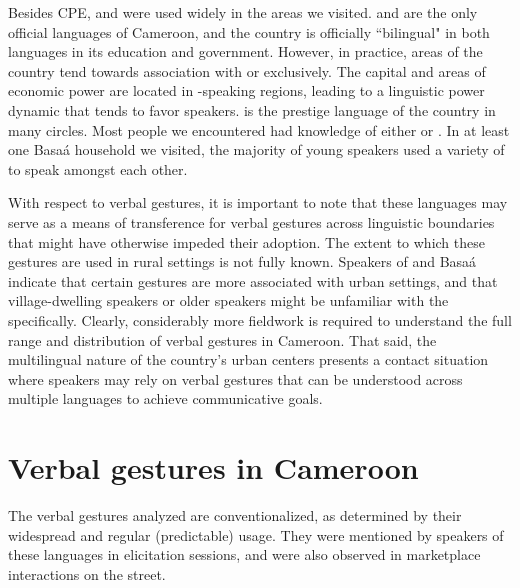 \documentclass[output=paper
,newtxmath
,modfonts
,nonflat]{langsci/langscibook}
\begin{document}
Besides CPE,  and  were used widely in the areas we visited.   and  are the only official languages of Cameroon, and the country is officially ``bilingual" in both languages in its education and government. However, in practice, areas of the country tend towards association with  or  exclusively. The capital and areas of economic power are located in -speaking regions, leading to a linguistic power dynamic that tends to favor  speakers.  is the prestige language of the country in many circles. Most people we encountered had knowledge of either  or . In at least one Basa\'a household we visited, the majority of young speakers used a variety of  to speak amongst each other. 

With respect to verbal gestures, it is important to note that these languages may serve as a means of transference for verbal gestures across linguistic boundaries that might have otherwise impeded their adoption. The extent to which these gestures are used in rural settings is not fully known. Speakers of  and Basa\'a indicate that certain gestures are more associated with urban settings, and that village-dwelling speakers or older speakers might be unfamiliar with the  specifically.  Clearly, considerably more fieldwork is required to understand the full range and distribution of verbal gestures in Cameroon. That said, the multilingual nature of the country's urban centers presents a  contact situation where speakers may rely on verbal gestures that can be understood across multiple languages to achieve communicative goals.


\section{Verbal gestures in Cameroon}\label{sec:pillion:vg}
The verbal gestures analyzed are conventionalized, as determined by their widespread and regular (predictable) usage. They were mentioned by speakers of these languages in elicitation sessions, and were also observed in marketplace interactions on the street. 

\noindent
\end{document}
